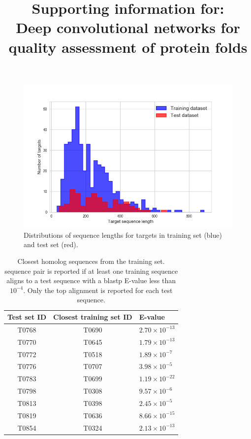 \documentclass[letter,10pt]{article}
\title{Supporting information for:\\ Deep convolutional networks for quality assessment of protein folds}
\author{}
\begin{document}
\maketitle


\begin{figure}[H]
    \centering
    \includegraphics[width=\linewidth]{Fig/datasetLengthDistributions.png}
    \caption{Distributions of sequence lengths for targets in training set (blue) and test set (red).}
    \label{Fig:dataLengthDist}
\end{figure}

\begin{table}[H]
\begin{center}
%
    \caption{Closest homolog sequences from the training set.
      sequence pair is reported if at least one training sequence
      aligns to a test sequence with a blastp E-value less than
      $10^{-4}$. Only the top alignment is reported for each test
      sequence.}
%
\begin{tabular}{ c | c | l }
    
    Test set ID & Closest training set ID & E-value \\
    \hline
    T0768 & T0690 & $2.70\times 10^{-13}$ \\
    T0770 & T0645 & $1.79\times 10^{-13}$ \\
    T0772 & T0518 & $1.89\times 10^{-7}$ \\
    T0776 & T0707 & $3.98\times 10^{-5}$ \\
    T0783 & T0699 & $1.19\times 10^{-22}$ \\
    T0798 & T0308 & $9.57\times 10^{-6}$ \\
    T0813 & T0398 & $2.45\times 10^{-5}$ \\
    T0819 & T0636 & $8.66\times 10^{-15}$ \\
    T0854 & T0324 & $2.13\times 10^{-13}$ \\
\end{tabular}
\label{Tbl:datasetsSimilarity}
\end{center}
\end{table}
\end{document}
